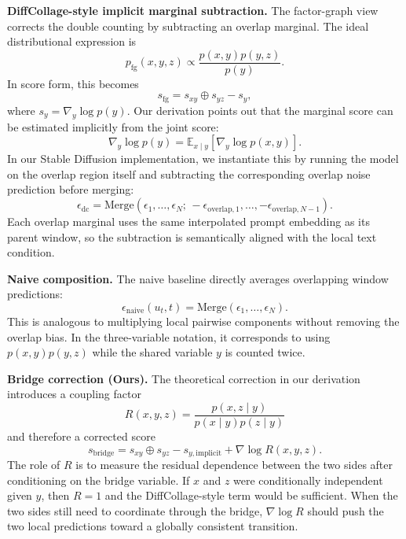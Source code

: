 \documentclass[10pt,conference,compsocconf]{IEEEtran}
\begin{document}
\textbf{DiffCollage-style implicit marginal subtraction.} The factor-graph view corrects the double counting by subtracting an overlap marginal.
The ideal distributional expression is
\begin{equation}
p_{\mathrm{fg}}(x,y,z) \propto \frac{p(x,y)p(y,z)}{p(y)} .
\end{equation}
In score form, this becomes
\begin{equation}
s_{\mathrm{fg}} = s_{xy}\oplus s_{yz} - s_y ,
\end{equation}
where $s_y=\nabla_y\log p(y)$.
Our derivation points out that the marginal score can be estimated implicitly from the joint score:
\begin{equation}
\nabla_y\log p(y) = \mathbb{E}_{x\mid y} \left[\nabla_y\log p(x,y)\right].
\end{equation}
In our Stable Diffusion implementation, we instantiate this by running the model on the overlap region itself and subtracting the corresponding overlap noise prediction before merging:
\begin{equation}
\epsilon_{\mathrm{dc}} = \mathrm{Merge} \left(\epsilon_1,\ldots,\epsilon_N;\, -\epsilon_{\mathrm{overlap},1},\ldots, -\epsilon_{\mathrm{overlap},N-1}\right).
\end{equation}
Each overlap marginal uses the same interpolated prompt embedding as its parent window, so the subtraction is semantically aligned with the local text condition.

\textbf{Naive composition.} The naive baseline directly averages overlapping window predictions:
\begin{equation}
\epsilon_{\mathrm{naive}}(u_t,t) = \mathrm{Merge}\left(\epsilon_1,\ldots,\epsilon_N\right).
\end{equation}
This is analogous to multiplying local pairwise components without removing the overlap bias.
In the three-variable notation, it corresponds to using
$p(x,y)p(y,z)$ while the shared variable $y$ is counted twice.

\textbf{Bridge correction (Ours).} The theoretical correction in our derivation introduces a coupling factor
\begin{equation}
R(x,y,z) = \frac{p(x,z\mid y)} {p(x\mid y)p(z\mid y)}
\end{equation}
and therefore a corrected score
\begin{equation}
s_{\mathrm{bridge}} = s_{xy}\oplus s_{yz} - s_{y,\mathrm{implicit}} + \nabla\log R(x,y,z).
\end{equation}
The role of $R$ is to measure the residual dependence between the two sides after conditioning on the bridge variable.
If $x$ and $z$ were conditionally independent given $y$, then $R=1$ and the DiffCollage-style term would be sufficient.
When the two sides still need to coordinate through the bridge, $\nabla\log R$ should push the two local predictions toward a globally consistent transition.
\end{document}
